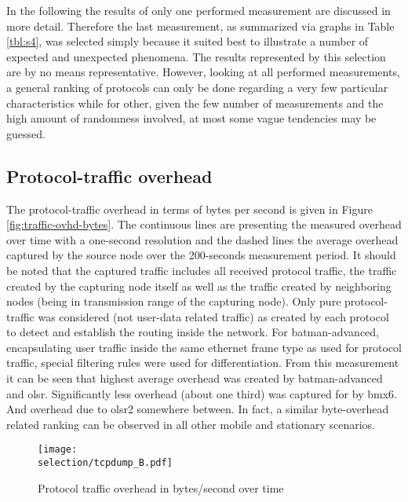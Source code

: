 \documentclass[a4paper,12pt,twoside]{article}
\begin{document}
\newcommand{\selection}{test_data/wbmv7-axn-16_2014-05-16_19-28-43/wbmv7-axn-16_2014-05-16_19-28-43_wibed-f41ab0/wbm-axn} 

In the following the results of only one performed measurement are
discussed in more detail. Therefore the last measurement, as summarized
via graphs in Table \ref{tbl:s4}, was selected simply because it
suited best to illustrate a number of expected and unexpected
phenomena. The results represented by this selection are by no means
representative. However, looking at all performed measurements, a
general ranking of protocols can only be done regarding a very few
particular characteristics while for other, given the few number of
measurements and the high amount of randomness involved, at most some
vague tendencies may be guessed.

\subsection{Protocol-traffic overhead}

The protocol-traffic overhead in terms of bytes per second is given in
Figure \ref{fig:traffic-ovhd-bytes}.  The continuous lines are
presenting the measured overhead over time with a one-second
resolution and the dashed lines the average overhead captured by the
source node over the 200-seconds measurement period. It should be
noted that the captured traffic includes all received protocol
traffic, the traffic created by the capturing node itself as well as
the traffic created by neighboring nodes (being in transmission range
of the capturing node). Only pure protocol-traffic was considered (not
user-data related traffic) as created by each protocol to detect and
establish the routing inside the network. For batman-advanced,
encapsulating user traffic inside the same ethernet frame type as used
for protocol traffic, special filtering rules were used for
differentiation.
From this measurement it can be seen that highest average overhead was
created by batman-advanced and olsr. Significantly less overhead
(about one third) was captured for by bmx6. And overhead due to olsr2
somewhere between. In fact, a similar byte-overhead related ranking can
be observed in all other mobile and stationary scenarios.

\begin{figure}[!ht]
\centering
\texttt{[image: \\selection/tcpdump\_B.pdf]}
\caption{Protocol traffic overhead in bytes/second over time}
\label{fig:traffic-ovhd-packets}
\end{figure}
\end{document}
